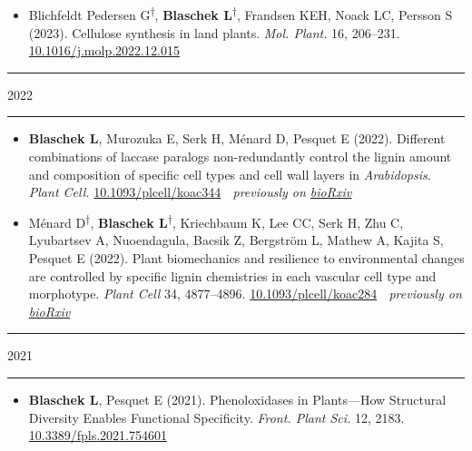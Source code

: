 \documentclass[11pt]{article}
\newcommand*{\xdash}[1][3em]{\rule[0.5ex]{#1}{0.55pt}}
\begin{document}
\vspace{-0.175cm}	
\begin{itemize}[label={},itemindent=-9pt,leftmargin=24pt]
	\itemsep-0.1cm
	\item Blichfeldt Pedersen G\textsuperscript{$\dagger$}, \textbf{Blaschek L}\textsuperscript{$\dagger$}, Frandsen KEH, Noack LC, Persson S (2023). Cellulose synthesis in land plants. \textit{Mol. Plant.} 16, 206–231. \href{https://doi.org/10.1016/j.molp.2022.12.015}{10.1016/j.molp.2022.12.015}
\end{itemize}


\hspace*{\fill} \xdash[6em] \large{\textsc{2022}} \xdash[6em] \hspace*{\fill} \normalsize

\vspace{-0.175cm}	
\begin{itemize}[label={},itemindent=-9pt,leftmargin=24pt]
	\itemsep-0.1cm
	\item \textbf{Blaschek L}, Murozuka E, Serk H, Ménard D, Pesquet E (2022). Different combinations of laccase paralogs non-redundantly control the lignin amount and composition of specific cell types and cell wall layers in \textit{Arabidopsis}. \textit{Plant Cell.} \href{https://doi.org/10.1093/plcell/koac344}{10.1093/plcell/koac344} \textemdash $\;$ \textit{previously on \href{https://doi.org/10.1101/2022.05.04.490011}{bioRxiv}}
	\item Ménard D\textsuperscript{$\dagger$}, \textbf{Blaschek L}\textsuperscript{$\dagger$}, Kriechbaum K, Lee CC, Serk H, Zhu C, Lyubartsev A, Nuoendagula, Bacsik Z, Bergström L, Mathew A, Kajita S, Pesquet E (2022). Plant biomechanics and resilience to environmental changes are controlled by specific lignin chemistries in each vascular cell type and morphotype. \textit{Plant Cell} 34, 4877–4896. \href{https://doi.org/10.1093/plcell/koac284}{10.1093/plcell/koac284} \textemdash $\;$ \textit{previously on \href{https://doi.org/10.1101/2021.06.12.447240}{bioRxiv}}
\end{itemize}

\hspace*{\fill} \xdash[6em] \large{\textsc{2021}} \xdash[6em] \hspace*{\fill} \normalsize

\vspace{-0.175cm}	
\begin{itemize}[label={},itemindent=-9pt,leftmargin=24pt]
	\itemsep-0.1cm
	\item \textbf{Blaschek L}, Pesquet E (2021). Phenoloxidases in Plants—How Structural Diversity Enables Functional Specificity. \textit{Front. Plant Sci.} 12, 2183.
	\href{https://doi.org/10.3389/fpls.2021.754601}{10.3389/fpls.2021.754601}
\end{itemize}
\end{document}
